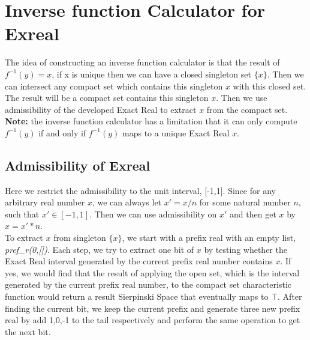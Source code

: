 \documentclass[12pt,twoside,notitlepage]{report}
\begin{document}


\section{Inverse function Calculator for Exreal} 
The idea of constructing an inverse function calculator is that the result of $f^{-1}(y) = x$, if x is unique then we can have a closed singleton set $\{x\}$. Then we can intersect any compact set which contains this singleton $x$ with this closed set. The result will be a compact set contains this singleton $x$. Then we use admissibility of the developed Exact Real to extract $x$ from the compact set.\\
\textbf{Note:} the inverse function calculator has a limitation that it can only compute $f^{-1}(y)$ if and only if $f^{-1}(y)$ maps to a unique Exact Real $x$.   
\subsection{Admissibility of Exreal}
Here we restrict the admissibility to the unit interval, [-1,1]. Since for any arbitrary real number $x$, we can always let $x' = x/n$ for some natural number $n$, such that $x' \in [-1,1]$. Then we can use admissibility on $x'$ and then get $x$ by $x = x' * n$.\\
To extract $x$ from singleton $\{x\}$, we start with a prefix real with an empty list, \textit{pref\_r(0,[])}. Each step, we try to extract one bit of $x$ by testing whether the Exact Real interval generated by the current prefix real number contains $x$. If yes, we would find that the result of applying the open set, which is the interval generated by the current prefix real number, to the compact set characteristic function would return a result Sierpinski Space that eventually maps to $\top$. After finding the current bit, we keep the current prefix and generate three new prefix real by add 1,0,-1 to the tail respectively and perform the same operation to get the next bit.
\end{document}
